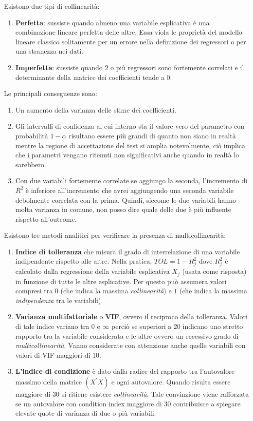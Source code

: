 \documentclass[a4page, 11pt]{article} %
\begin{document}
Esistono due tipi di collinearità:
\begin{enumerate}[noitemsep]
\item \textbf{Perfetta}: sussiste quando almeno una variabile esplicativa è una combinazione lineare perfetta delle altre. Essa viola le proprietà del modello lineare classico solitamente per un errore nella definizione dei regressori o per una stranezza nei dati.
\item \textbf{Imperfetta}: sussiste quando $2$ o più regressori sono fortemente correlati e il determinante della matrice dei coefficienti tende a $0$.
\end{enumerate}
Le principali conseguenze sono:
\begin{enumerate}[noitemsep]
\item Un aumento della varianza delle stime dei coefficienti.
\item Gli intervalli di confidenza al cui interno sta il valore vero del parametro con probabilità $1-\alpha$ risultano essere più grandi di quanto non siano in realtà mentre la regione di accettazione del test si amplia notevolmente, ciò implica che i parametri vengano ritenuti non significativi anche quando in realtà lo sarebbero.
\item Con due variabili fortemente correlate se aggiungo la seconda, l’incremento di $R^{2}$ è inferiore all’incremento che avrei aggiungendo una seconda variabile debolmente correlata con la prima. Quindi, siccome le due variabili hanno molta varianza in comune, non posso dire quale delle due è più influente rispetto all’outcome.
\end{enumerate}
Esistono tre metodi analitici per verificare la presenza di multicollinearità:
\begin{enumerate}[noitemsep]
\item \textbf{Indice di tolleranza} che misura il grado di interrelazione di una variabile indipendente rispetto alle altre. Nella pratica, $TOL = 1 - R^{2}_j$ dove $R^{2}_j$ è calcolato dalla regressione della variabile esplicativa $X_j$ (usata come risposta) in funzione di tutte le altre esplicative. Per questo può assumera valori compresi tra $0$ (che indica la massima \textit{collinearità}) e $1$ (che indica la massima \textit{indipendenza} tra le variabili).

\item \textbf{Varianza multifattoriale} o \textbf{VIF}, ovvero il reciproco della tolleranza. 
Valori di tale indice variano tra $0$ e $\infty$ perciò se superiori a $20$ indicano uno stretto rapporto tra la variabile considerata e le altre ovvero un eccessivo grado di \textit{multicollinearità}. Vanno considerate con attenzione anche quelle variabili con valori di VIF maggiori di $10$.

\item \textbf{L'indice di condizione} è dato dalla radice del rapporto tra l’autovalore massimo della matrice $(X^{\prime}X)$ e ogni autovalore. Quando risulta essere maggiore di $30$ si ritiene esistere \textit{collinearità}. Tale convinzione viene rafforzata se un autovalore con condition index maggiore di $30$ contribuisce a spiegare elevate quote di varianza di due o più variabili.
\end{enumerate}
\end{document}
